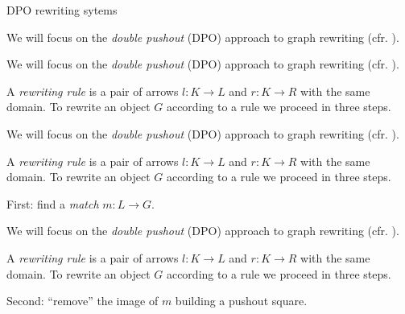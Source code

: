\documentclass[usenames,dvipsnames]{beamer}
\begin{document}
\begin{frame}{DPO rewriting sytems}\justifying
	\begin{overprint}
		
		We will focus on the \emph{double pushout} (DPO) approach  to  graph rewriting (cfr. \cite{ehrig2006fundamentals}). 
		\smallskip 
		
		
		We will focus on the \emph{double pushout} (DPO) approach  to  graph rewriting (cfr. \cite{ehrig2006fundamentals}). 
		\smallskip 
		
		A \emph{rewriting rule} is a pair  of arrows $l:K\to L$ and $r:K\to R$ with the same domain. To rewrite an object $G$ according to a rule we proceed in three steps.
		
		
		We will focus on the \emph{double pushout} (DPO) approach  to  graph rewriting (cfr. \cite{ehrig2006fundamentals}). 
		\smallskip 
		
		A \emph{rewriting rule} is a pair  of arrows $l:K\to L$ and $r:K\to R$ with the same domain. To rewrite an object $G$ according to a rule we proceed in three steps.
		
		First: find a \emph{match} $m:L\to G$.
		\begin{center}
		\end{center}
		
		

We will focus on the \emph{double pushout} (DPO) approach  to  graph rewriting (cfr. \cite{ehrig2006fundamentals}). 
\smallskip 

A \emph{rewriting rule} is a pair  of arrows $l:K\to L$ and $r:K\to R$ with the same domain. To rewrite an object $G$ according to a rule we proceed in three steps.		
		
		Second: ``remove'' the image of $m$  building a pushout square. \vspace{-0.075cm}
		\begin{center}
		\end{center}		


\end{overprint}
\end{frame}
\end{document}
